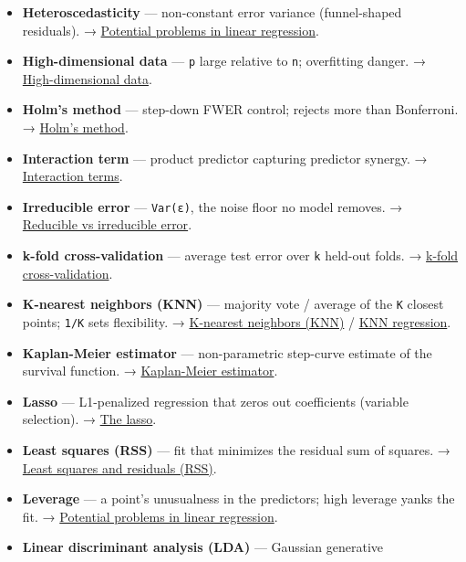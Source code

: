 \documentclass[
  10pt,
  letterpaper,
  onecolumn]{article}
\begin{document}
\begin{itemize}
  so far; \texttt{h(t)\ =\ f(t)/S(t)}. →
  \protect\hyperlink{hazard-function}{Hazard function}.
\item
  \textbf{Heteroscedasticity} --- non-constant error variance
  (funnel-shaped residuals). →
  \protect\hyperlink{potential-problems-in-linear-regression}{Potential
  problems in linear regression}.
\item
  \textbf{High-dimensional data} --- \texttt{p} large relative to
  \texttt{n}; overfitting danger. →
  \protect\hyperlink{high-dimensional-data}{High-dimensional data}.
\item
  \textbf{Holm's method} --- step-down FWER control; rejects more than
  Bonferroni. → \protect\hyperlink{holms-method}{Holm's method}.
\item
  \textbf{Interaction term} --- product predictor capturing predictor
  synergy. → \protect\hyperlink{interaction-terms}{Interaction terms}.
\item
  \textbf{Irreducible error} --- \texttt{Var(ε)}, the noise floor no
  model removes. →
  \protect\hyperlink{reducible-vs-irreducible-error}{Reducible vs
  irreducible error}.
\item
  \textbf{k-fold cross-validation} --- average test error over
  \texttt{k} held-out folds. →
  \protect\hyperlink{k-fold-cross-validation}{k-fold cross-validation}.
\item
  \textbf{K-nearest neighbors (KNN)} --- majority vote / average of the
  \texttt{K} closest points; \texttt{1/K} sets flexibility. →
  \protect\hyperlink{k-nearest-neighbors-knn}{K-nearest neighbors (KNN)}
  / \protect\hyperlink{knn-regression}{KNN regression}.
\item
  \textbf{Kaplan-Meier estimator} --- non-parametric step-curve estimate
  of the survival function. →
  \protect\hyperlink{kaplan-meier-estimator}{Kaplan-Meier estimator}.
\item
  \textbf{Lasso} --- L1-penalized regression that zeros out coefficients
  (variable selection). → \protect\hyperlink{the-lasso}{The lasso}.
\item
  \textbf{Least squares (RSS)} --- fit that minimizes the residual sum
  of squares. →
  \protect\hyperlink{least-squares-and-residuals-rss}{Least squares and
  residuals (RSS)}.
\item
  \textbf{Leverage} --- a point's unusualness in the predictors; high
  leverage yanks the fit. →
  \protect\hyperlink{potential-problems-in-linear-regression}{Potential
  problems in linear regression}.
\item
  \textbf{Linear discriminant analysis (LDA)} --- Gaussian generative

\end{itemize}
\end{document}
